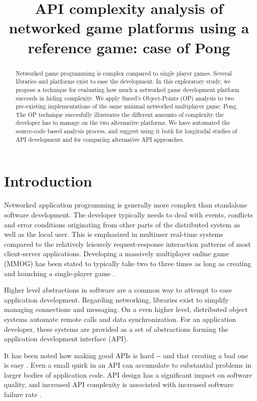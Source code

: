 \documentclass[conference]{IEEEtran}
\title{\phantomsection%
  API complexity analysis of networked game platforms using a reference game: case of Pong%
  \label{api-complexity-analysis-of-networked-game-platforms-using-a-reference-game-case-of-pong}}
\author{}
\date{}
\begin{document}
\maketitle
\begin{abstract}
Networked game programming is complex compared to single
player games. Several libraries and platforms exist to ease the
development. In this exploratory study, we propose a technique for
evaluating how much a networked game development platform succeeds
in hiding complexity. We apply Sneed's Object-Points (OP) analysis
to two pre-existing implementations of the same minimal networked
multiplayer game: Pong. The OP technique succesfully illustrates
the different amounts of complexity the developer has to manage on
the two alternative platforms. We have automated the source-code
based analysis process, and suggest using it both for longitudal
studies of API development and for comparing alternative API
approaches.
\end{abstract}


\section{Introduction%
  \label{introduction}%
}

Networked application programming is generally more complex than
standalone software development. The developer typically needs to deal
with events, conflicts and error conditions originating from other
parts of the distributed system as well as the local user. This is
emphasized in multiuser real-time systems compared to the relatively
leisurely request-response interaction patterns of most client-server
applications. Developing a massively multiplayer online game (MMOG)
has been stated to typically take two to three times as long as
creating and launching a single-player game \cite{middleware}.

Higher level abstractions in software are a common way to attempt to
ease application development. Regarding networking, libraries exist to
simplify managing connections and messaging. On a even higher level,
distributed object systems automate remote calls and data
synchronization. For an application developer, these systems are
provided as a set of abstractions forming the application development
interface (API).

It has been noted how making good APIs is hard -{}- and that creating a
bad one is easy \cite{api-matters}. Even a small quirk in an API can
accumulate to substantial problems in larger bodies of application
code. API design has a significant impact on software quality, and
increased API complexity is associated with increased software failure
rate \cite{cmu-api_failures}.
\end{document}
